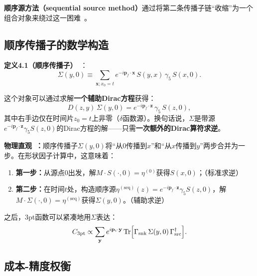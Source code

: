\documentclass[12pt,a4paper]{ctexart}
\theoremstyle{definition}
\begin{document}
\textbf{顺序源方法（sequential source method）}通过将第二条传播子链``收缩''为一个组合对象来绕过这一困难~\cite{GattringerLang2010,propagatorSolvers2026,formFactors2026}。

\subsection{顺序传播子的数学构造}

\textbf{定义4.1（顺序传播子）}~\cite{GattringerLang2010,formFactors2026}：
\begin{equation}\label{eq:sequential_def}
    \Sigma(y, 0) \equiv \sum_{\mathbf{x}; x_0=t} e^{-i\mathbf{p}_f\cdot\mathbf{x}}\,
    S(y, x)\,\gamma_5\,S(x, 0).
\end{equation}

这个对象可以通过求解\textbf{一个辅助Dirac方程}获得：
\begin{equation}\label{eq:sequential_dirac}
    D(z, y)\,\Sigma(y, 0) = e^{-i\mathbf{p}_f\cdot\mathbf{z}}\,\gamma_5\,S(z, 0),
\end{equation}
其中右手边仅在时间片$z_0 = t$上非零（$\delta$函数源）。换句话说，$\Sigma$是带源$e^{-i\mathbf{p}_f\cdot\mathbf{z}}\gamma_5 S(z,0)$的Dirac方程的解——只需\textbf{一次额外的Dirac算符求逆}。

\textbf{物理直观~\cite{propagatorSolvers2026}：}顺序传播子$\Sigma(y,0)$将``从0传播到$x$''和``从$x$传播到$y$''两步合并为一步。在形状因子计算中，这意味着：
\begin{enumerate}[leftmargin=*]
    \item \textbf{第一步：}从源点0出发，解$M \cdot S(\cdot, 0) = \eta^{(0)}$获得$S(x,0)$；（标准求逆）
    \item \textbf{第二步：}在时间$t$处，构造顺序源$\eta^{(\text{seq})}(z) = e^{-i\mathbf{p}_f\cdot\mathbf{z}}\gamma_5 S(z,0)$，解$M \cdot \Sigma(\cdot, 0) = \eta^{(\text{seq})}$获得$\Sigma(y,0)$。（辅助求逆）
\end{enumerate}

之后，3pt函数可以紧凑地用$\Sigma$表达：
\begin{equation}
    C_{3\text{pt}} \propto \sum_{\mathbf{y}} e^{i\mathbf{p}_i\cdot\mathbf{y}} \operatorname{Tr}\Bigl[ \Gamma_{\text{snk}}\,\Sigma(y,0)\,\Gamma_{\text{src}}^\dagger \Bigr].
\end{equation}

\subsection{成本-精度权衡}
\end{document}
